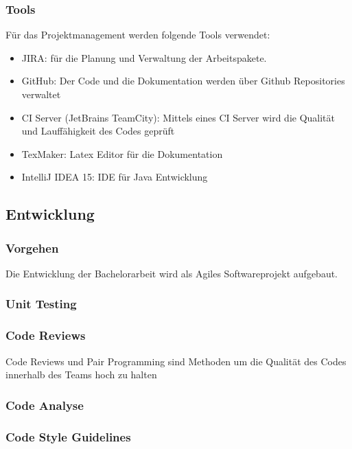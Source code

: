 \documentclass[10pt,a4paper]{article}
\begin{document}
\subsubsection{Tools}
Für das Projektmanagement werden folgende Tools verwendet:
\begin{itemize}
\item JIRA: für die Planung und Verwaltung der Arbeitspakete.
\item GitHub: Der Code und die Dokumentation werden über Github Repositories verwaltet
\item CI Server (JetBrains TeamCity): Mittels eines CI Server wird die Qualität und Lauffähigkeit des Codes geprüft
\item TexMaker: Latex Editor für die Dokumentation
\item IntelliJ IDEA 15: IDE für Java Entwicklung
\end{itemize}
\subsection{Entwicklung}
\subsubsection{Vorgehen}
Die Entwicklung der Bachelorarbeit wird als Agiles Softwareprojekt aufgebaut.
\subsubsection{Unit Testing}
\subsubsection{Code Reviews}
Code Reviews und Pair Programming sind Methoden um die Qualität des Codes innerhalb des Teams hoch zu halten
\subsubsection{Code Analyse}
\subsubsection{Code Style Guidelines}
\end{document}
